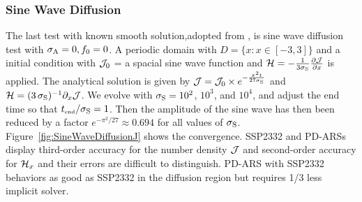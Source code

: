\subsubsection{Sine Wave Diffusion}
The last test with known smooth solution,adopted from \cite{radice_etal_2013}, is sine wave diffusion test with $\sigma_{{\rm A}} = 0, f_0 = 0$.
A periodic domain with $D=\{x:x\in[-3,3]\}$ and a initial condition with $\mathcal{J}_{0}$ = a spacial sine wave function and $\mathcal{H} =-\frac{1}{3\sigma_{{\rm S}}}\frac{\partial \mathcal{J}}{\partial x}$ is applied.
The analytical solution is given by $\mathcal{J} = \mathcal{J}_{0} \times e^{-\frac{\pi^2 t}{27\sigma_{{\rm S}}}}$ and $\mathcal{H} = (3\,\sigma_{{\rm S}})^{-1}\partial_{x}{\mathcal{J}}$.
We evolve with $\sigma_{{\rm S}}=10^{2}$, $10^{3}$, and $10^{4}$, and adjust the end time so that $t_{\mbox{\tiny end}}/\sigma_{{\rm S}}=1$. 
Then the amplitude of the sine wave has then been reduced by a factor $e^{-\pi^{2}/27}\approx0.694$ for all values of $\sigma_{{\rm S}}$. 
Figure~\ref{fig:SineWaveDiffusionJ} shows the convergence.
SSP2332 and PD-ARSs display third-order accuracy for the number density $\mathcal{J}$ and second-order accuracy for $\mathcal{H}_{x}$ and their errors are difficult to distinguish.
PD-ARS with SSP2332 behaviors as good as SSP2332 in the diffusion region but requires 1/3 less implicit solver.
